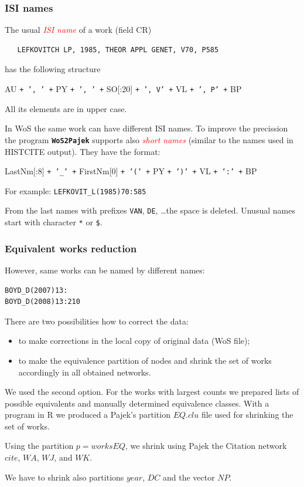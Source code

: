 \documentclass[hyperref={pdfstartview={FitBH -32768},
                         pdfpagemode=FullScreen,
                         plainpages=false,
                         colorlinks=true}
              ]{beamer}
\newcommand{\WoSPajek}{\texttt{\textbf{WoS2Pajek}}\xspace}
\newcommand{\keyw}[1]{\textcolor{red}{\emph{#1}}}
\begin{document}
\begin{frame}[fragile]
\frametitle{ISI names}
\footnotesize
The usual \keyw{ISI name} of a work (field CR)
\begin{verbatim}
   LEFKOVITCH LP, 1985, THEOR APPL GENET, V70, P585
\end{verbatim}
has the following structure\medskip

   AU \texttt{+ ', ' +} PY \texttt{+ ', ' +} SO[:20] \texttt{+ ', V' +} VL  \texttt{+ ', P' +} BP\medskip

\noindent All its elements are in upper case.

In WoS the same work can have different ISI names. To improve
the precission the program \WoSPajek supports also
\keyw{short names} (similar to the names used in HISTCITE output).
They have the format:\medskip

   LastNm[:8] \texttt{+ '\_' +} FirstNm[0] \texttt{+ '(' +} PY
   \texttt{+ ')' +} VL \texttt{+ ':' +} BP\medskip

For example: \quad
\texttt{LEFKOVIT\_L(1985)70:585}

From the last names with prefixes \texttt{VAN}, \texttt{DE}, \ldots the space is deleted.
Unusual names start with character \texttt{*} or \texttt{\$}.

\end{frame}

\begin{frame}[fragile]
\frametitle{Equivalent works reduction}
\small 
However, same works can be named by different names:
\begin{verbatim}
BOYD_D(2007)13:
BOYD_D(2008)13:210
\end{verbatim}

There are two possibilities how to correct the data:
\begin{itemize}
\item to make corrections in the local copy of original data (WoS file);
\item to make the equivalence partition of nodes and shrink the set of works accordingly in all  obtained networks.
\end{itemize}
We used the second option. For the works with largest counts we prepared lists of possible equivalents and manually determined equivalence classes. With a program in R we produced a Pajek's partition $EQ.clu$ file used for shrinking the set of works. \medskip

Using the partition $p=worksEQ$, we shrink using Pajek the Citation network $cite$, $WA$, $WJ$, and $WK$. \medskip

We have to shrink also partitions $year$,  $DC$ and the vector $NP$. 

\end{frame}
\end{document}
